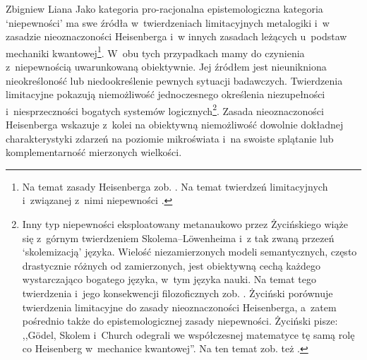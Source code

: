 \begin{artplenv}{Zbigniew Liana}
\enlargethispage{-\baselineskip}
Jako kategoria pro-racjonalna epistemologiczna kategoria ‘niepewności' ma swe źródła w~twierdzeniach limitacyjnych metalogiki i~w zasadzie nieoznaczoności Heisenberga i~w innych zasadach leżących u~podstaw mechaniki kwantowej\footnote{Na temat zasady Heisenberga zob.
\parencites[][s.~158n]{zycinski_teizm_1985}[][s.~138nn]{zycinski_structure_1988}[][s.~246n]{zycinski_struktura_2013_liana}. %
 Na temat twierdzeń limitacyjnych i~związanej z~nimi niepewności  
\parencites[zob.][s.~158]{zycinski_teizm_1985}[][s.~18–46]{zycinski_teizm_1988}[][s.~102–113]{zycinski_structure_1988}[][s.~183–201]{zycinski_struktura_2013_liana}[][s.~262–276]{zycinski_elementy_1996}[][s.~355–374]{zycinski_elementy_2015}.
}.
W~obu tych przypadkach mamy do czynienia z~niepewnością uwarunkowaną obiektywnie. Jej źródłem jest nieunikniona nieokreśloność lub niedookreślenie pewnych sytuacji badawczych. Twierdzenia limitacyjne pokazują niemożliwość jednoczesnego określenia niezupełności i~niesprzeczności bogatych systemów logicznych\footnote{Inny typ niepewności eksploatowany metanaukowo przez Życińskiego wiąże się z~górnym twierdzeniem Skolema–Löwenheima i~z tak zwaną przezeń ‘skolemizacją' języka. Wielość niezamierzonych modeli semantycznych, często drastycznie różnych od zamierzonych, jest obiektywną cechą każdego wystarczająco bogatego języka, w~tym języka nauki. Na temat tego twierdzenia i~jego konsekwencji filozoficznych zob.
\parencites[][s.~22–46]{zycinski_structure_1988}[][s.~270–276]{zycinski_elementy_1996}[][s.~369–373]{zycinski_elementy_2015}. %
 Życiński porównuje twierdzenia limitacyjne do zasady nieoznaczoności Heisenberga, a~zatem pośrednio także do epistemologicznej zasady niepewności. Życiński 
\parencites*[][s.~109]{zycinski_structure_1988}[][s.~194]{zycinski_struktura_2013_liana} %
 pisze: ,,Gödel, Skolem i~Church odegrali we współczesnej matematyce tę samą rolę co Heisenberg w~mechanice kwantowej''. Na ten temat zob. też 
\parencites[][s.~273]{zycinski_elementy_1996}[][s.~371]{zycinski_elementy_2015}.%
}. Zasada nieoznaczoności Heisenberga wskazuje z~kolei na obiektywną niemożliwość dowolnie dokładnej charakterystyki zdarzeń na poziomie mikroświata i~na swoiste splątanie lub komplementarność mierzonych wielkości.


\end{artplenv}

